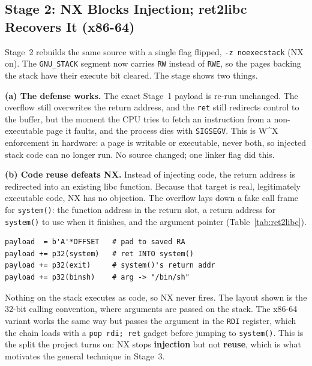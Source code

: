\documentclass[10pt,twocolumn,letterpaper]{article}
\newcommand{\code}[1]{\texttt{\small #1}}
\begin{document}
\subsection{Stage 2: NX Blocks Injection; ret2libc Recovers It (x86-64)}

\vspace{4pt}
Stage~2 rebuilds the same source with a single flag flipped,
\code{-z noexecstack} (NX on). The \code{GNU\_STACK} segment now carries
\code{RW} instead of \code{RWE}, so the pages backing the stack have their
execute bit cleared. The stage shows two things.

\textbf{(a) The defense works.} The exact Stage~1 payload is re-run unchanged.
The overflow still overwrites the return address, and the \code{ret} still
redirects control to the buffer, but the moment the CPU tries to fetch an
instruction from a non-executable page it faults, and the process dies with
\code{SIGSEGV}. This is W\^{}X enforcement in hardware: a page is writable or
executable, never both, so injected stack code can no longer run. No source
changed; one linker flag did this.

\textbf{(b) Code reuse defeats NX.} Instead of injecting code, the return address
is redirected into an existing libc function. Because that target is real,
legitimately executable code, NX has no objection. The overflow lays down a fake
call frame for \code{system()}: the function address in the return slot, a
return address for \code{system()} to use when it finishes, and the argument
pointer (Table~\ref{tab:ret2libc}).
\begin{lstlisting}[style=py]
payload  = b'A'*OFFSET   # pad to saved RA
payload += p32(system)   # ret INTO system()
payload += p32(exit)     # system()'s return addr
payload += p32(binsh)    # arg -> "/bin/sh"
\end{lstlisting}
\noindent Nothing on the stack executes as code, so NX never fires. The layout
shown is the 32-bit calling convention, where arguments are passed on the stack.
The x86-64 variant works the same way but passes the argument in the \code{RDI}
register, which the chain loads with a \code{pop rdi; ret} gadget before jumping
to \code{system()}. This is the split the project turns on: NX stops
\textbf{injection} but not \textbf{reuse}, which is what motivates the general
technique in Stage~3.
\end{document}
